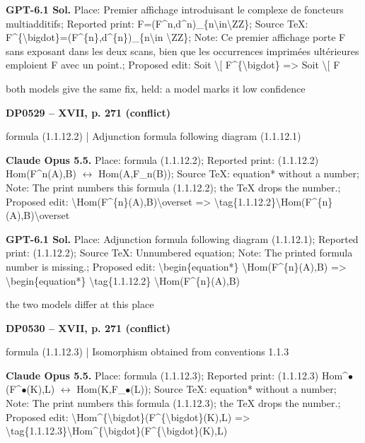 \textbf{GPT-6.1 Sol.} Place: Premier affichage introduisant le complexe de foncteurs multiadditifs; Reported print: F=\allowbreak (F\textasciicircum{}n,d\textasciicircum{}n)\_\{n\textbackslash{}in\textbackslash{}ZZ\}; Source TeX: F\textasciicircum{}\{\textbackslash{}bigdot\}=\allowbreak (F\textasciicircum{}\{n\},d\textasciicircum{}\{n\})\_\{n\textbackslash{}in \textbackslash{}ZZ\}; Note: Ce premier affichage porte F sans exposant dans les deux scans, bien que les occurrences imprimées ultérieures emploient F avec un point.; Proposed edit: Soit \textbackslash{}[ F\textasciicircum{}\{\textbackslash{}bigdot\} =\allowbreak > Soit \textbackslash{}[ F\par
both models give the same fix, held: a model marks it low confidence\par
\par\noindent\hypertarget{DP0529}{}\textbf{DP0529 -- XVII, p. 271 (conflict)}\par
formula (1.1.12.2) | Adjunction formula following diagram (1.1.12.1)\par
\textbf{Claude Opus 5.5.} Place: formula (1.1.12.2); Reported print: (1.1.12.2) Hom(F\textasciicircum{}n(A),B) \ensuremath{\leftrightarrow} Hom(A,F\_n(B)); Source TeX: equation* without a number; Note: The print numbers this formula (1.1.12.2); the TeX drops the number.; Proposed edit: \textbackslash{}Hom(F\textasciicircum{}\{n\}(A),B)\textbackslash{}overset =\allowbreak > \textbackslash{}tag\{1.1.12.2\}\textbackslash{}Hom(F\textasciicircum{}\{n\}(A),B)\textbackslash{}overset\par
\textbf{GPT-6.1 Sol.} Place: Adjunction formula following diagram (1.1.12.1); Reported print: (1.1.12.2); Source TeX: Unnumbered equation; Note: The printed formula number is missing.; Proposed edit: \textbackslash{}begin\{equation*\} \textbackslash{}Hom(F\textasciicircum{}\{n\}(A),B) =\allowbreak > \textbackslash{}begin\{equation*\} \textbackslash{}tag\{1.1.12.2\} \textbackslash{}Hom(F\textasciicircum{}\{n\}(A),B)\par
the two models differ at this place\par
\par\noindent\hypertarget{DP0530}{}\textbf{DP0530 -- XVII, p. 271 (conflict)}\par
formula (1.1.12.3) | Isomorphism obtained from conventions 1.1.3\par
\textbf{Claude Opus 5.5.} Place: formula (1.1.12.3); Reported print: (1.1.12.3) Hom\textasciicircum{}\ensuremath{\bullet}(F\textasciicircum{}\ensuremath{\bullet}(K),L) \ensuremath{\leftrightarrow} Hom(K,F\_\ensuremath{\bullet}(L)); Source TeX: equation* without a number; Note: The print numbers this formula (1.1.12.3); the TeX drops the number.; Proposed edit: \textbackslash{}Hom\textasciicircum{}\{\textbackslash{}bigdot\}(F\textasciicircum{}\{\textbackslash{}bigdot\}(K),L) =\allowbreak > \textbackslash{}tag\{1.1.12.3\}\textbackslash{}Hom\textasciicircum{}\{\textbackslash{}bigdot\}(F\textasciicircum{}\{\textbackslash{}bigdot\}(K),L)\par

